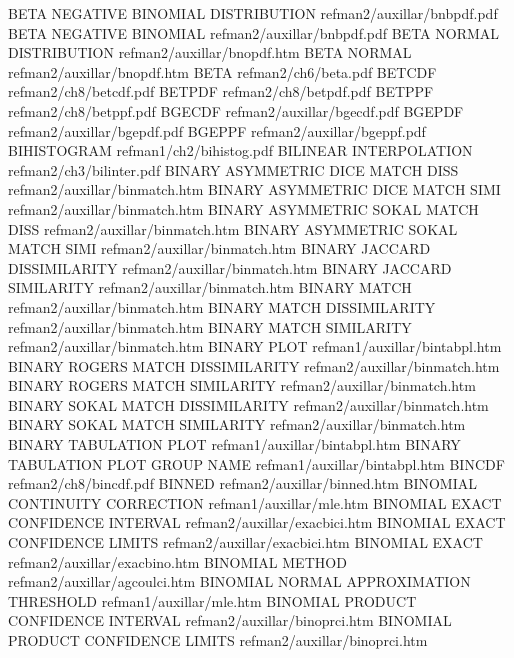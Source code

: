 BETA NEGATIVE BINOMIAL DISTRIBUTION     refman2/auxillar/bnbpdf.pdf
BETA NEGATIVE BINOMIAL                  refman2/auxillar/bnbpdf.pdf
BETA NORMAL DISTRIBUTION                refman2/auxillar/bnopdf.htm
BETA NORMAL                             refman2/auxillar/bnopdf.htm
BETA                                    refman2/ch6/beta.pdf
BETCDF                                  refman2/ch8/betcdf.pdf
BETPDF                                  refman2/ch8/betpdf.pdf
BETPPF                                  refman2/ch8/betppf.pdf
BGECDF                                  refman2/auxillar/bgecdf.pdf
BGEPDF                                  refman2/auxillar/bgepdf.pdf
BGEPPF                                  refman2/auxillar/bgeppf.pdf
BIHISTOGRAM                             refman1/ch2/bihistog.pdf
BILINEAR INTERPOLATION                  refman2/ch3/bilinter.pdf
BINARY ASYMMETRIC DICE MATCH DISS       refman2/auxillar/binmatch.htm
BINARY ASYMMETRIC DICE MATCH SIMI       refman2/auxillar/binmatch.htm
BINARY ASYMMETRIC SOKAL MATCH DISS      refman2/auxillar/binmatch.htm
BINARY ASYMMETRIC SOKAL MATCH SIMI      refman2/auxillar/binmatch.htm
BINARY JACCARD DISSIMILARITY            refman2/auxillar/binmatch.htm
BINARY JACCARD SIMILARITY               refman2/auxillar/binmatch.htm
BINARY MATCH                            refman2/auxillar/binmatch.htm
BINARY MATCH DISSIMILARITY              refman2/auxillar/binmatch.htm
BINARY MATCH SIMILARITY                 refman2/auxillar/binmatch.htm
BINARY PLOT                             refman1/auxillar/bintabpl.htm
BINARY ROGERS MATCH DISSIMILARITY       refman2/auxillar/binmatch.htm
BINARY ROGERS MATCH SIMILARITY          refman2/auxillar/binmatch.htm
BINARY SOKAL MATCH DISSIMILARITY        refman2/auxillar/binmatch.htm
BINARY SOKAL MATCH SIMILARITY           refman2/auxillar/binmatch.htm
BINARY TABULATION PLOT                  refman1/auxillar/bintabpl.htm
BINARY TABULATION PLOT GROUP NAME       refman1/auxillar/bintabpl.htm
BINCDF                                  refman2/ch8/bincdf.pdf
BINNED                                  refman2/auxillar/binned.htm
BINOMIAL CONTINUITY CORRECTION          refman1/auxillar/mle.htm
BINOMIAL EXACT CONFIDENCE INTERVAL      refman2/auxillar/exacbici.htm
BINOMIAL EXACT CONFIDENCE LIMITS        refman2/auxillar/exacbici.htm
BINOMIAL EXACT                          refman2/auxillar/exacbino.htm
BINOMIAL METHOD                         refman2/auxillar/agcoulci.htm
BINOMIAL NORMAL APPROXIMATION THRESHOLD refman1/auxillar/mle.htm
BINOMIAL PRODUCT CONFIDENCE INTERVAL    refman2/auxillar/binoprci.htm
BINOMIAL PRODUCT CONFIDENCE LIMITS      refman2/auxillar/binoprci.htm
